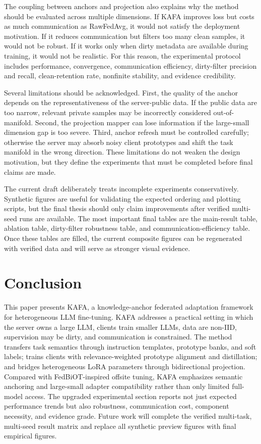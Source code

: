 \documentclass[conference]{IEEEtran}
\begin{document}
The coupling between anchors and projection also explains why the method should be evaluated across multiple dimensions. If KAFA improves loss but costs as much communication as RawFedAvg, it would not satisfy the deployment motivation. If it reduces communication but filters too many clean samples, it would not be robust. If it works only when dirty metadata are available during training, it would not be realistic. For this reason, the experimental protocol includes performance, convergence, communication efficiency, dirty-filter precision and recall, clean-retention rate, nonfinite stability, and evidence credibility.

Several limitations should be acknowledged. First, the quality of the anchor depends on the representativeness of the server-public data. If the public data are too narrow, relevant private samples may be incorrectly considered out-of-manifold. Second, the projection mapper can lose information if the large-small dimension gap is too severe. Third, anchor refresh must be controlled carefully; otherwise the server may absorb noisy client prototypes and shift the task manifold in the wrong direction. These limitations do not weaken the design motivation, but they define the experiments that must be completed before final claims are made.

The current draft deliberately treats incomplete experiments conservatively. Synthetic figures are useful for validating the expected ordering and plotting scripts, but the final thesis should only claim improvements after verified multi-seed runs are available. The most important final tables are the main-result table, ablation table, dirty-filter robustness table, and communication-efficiency table. Once these tables are filled, the current composite figures can be regenerated with verified data and will serve as stronger visual evidence.

\section{Conclusion}
This paper presents KAFA, a knowledge-anchor federated adaptation framework for heterogeneous LLM fine-tuning. KAFA addresses a practical setting in which the server owns a large LLM, clients train smaller LLMs, data are non-IID, supervision may be dirty, and communication is constrained. The method transfers task semantics through instruction templates, prototype banks, and soft labels; trains clients with relevance-weighted prototype alignment and distillation; and bridges heterogeneous LoRA parameters through bidirectional projection. Compared with FedBiOT-inspired offsite tuning, KAFA emphasizes semantic anchoring and large-small adapter compatibility rather than only limited full-model access. The upgraded experimental section reports not just expected performance trends but also robustness, communication cost, component necessity, and evidence grade. Future work will complete the verified multi-task, multi-seed result matrix and replace all synthetic preview figures with final empirical figures.
\end{document}
